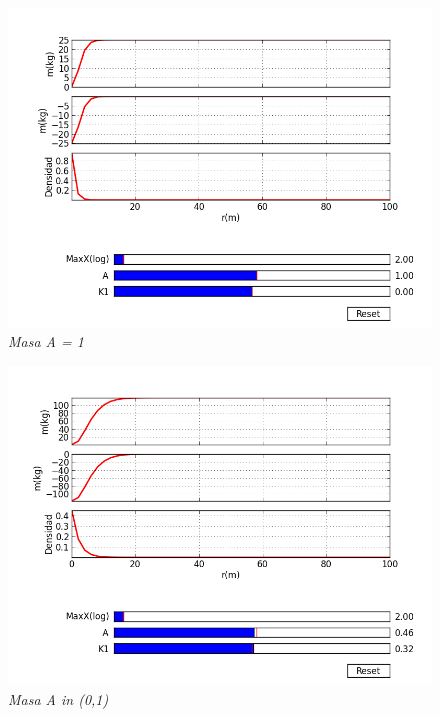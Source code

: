 \documentclass[12pt]{book}
\begin{document}
\begin{figure}[!h]
 \centering
 \includegraphics[scale=0.7]{masa1.png}
 \caption{\emph{Masa A = 1}}
 \label{Fig: 1}
\end{figure}

\begin{figure}[!h]
 \centering
 \includegraphics[scale=0.7]{masa2.png}
 \caption{\emph{Masa A in (0,1) }}
 \label{Fig: 1}
\end{figure}
\end{document}
